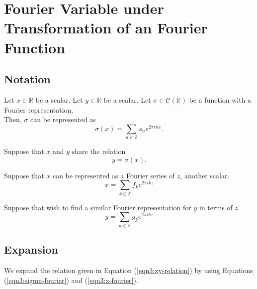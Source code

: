 \documentclass{article}
\begin{document}
    \section{Fourier Variable under Transformation of an Fourier Function}

    \subsection{Notation}
    Let $x \in \mathbb{R}$ be a scalar. Let $y \in \mathbb{R}$ be a scalar. Let $\sigma \in \mathcal{C}(\mathbb{R})$ be a function with a Fourier representation.\\

    Then, $\sigma$ can be represented as
    \begin{equation}
        \sigma(x) = \sum_{n \in \mathbb{Z}} s_n e^{2 \pi i n x}.
        \label{eqn3:sigma-fourier}
    \end{equation}

    Suppose that $x$ and $y$ share the relation
    \begin{equation}
        y = \sigma(x).
        \label{eqn3:xy-relation}
    \end{equation}

    Suppose that $x$ can be represented as a Fourier series of $z$, another scalar.
    \begin{equation}
        x = \sum_{k \in \mathbb{Z}} f_k e^{2\pi i k z}
        \label{eqn3:x-fourier}
    \end{equation}

    Suppose that wish to find a similar Fourier representation for $y$ in terms of $z$.
    \begin{equation}
        y = \sum_{k \in \mathbb{Z}} g_k e^{2\pi i k z}
        \label{eqn3:y-fourier}
    \end{equation}

    \subsection{Expansion}
    We expand the relation given in Equation (\ref{eqn3:xy-relation}) by using Equations (\ref{eqn3:sigma-fourier}) and (\ref{eqn3:x-fourier}).
\end{document}

